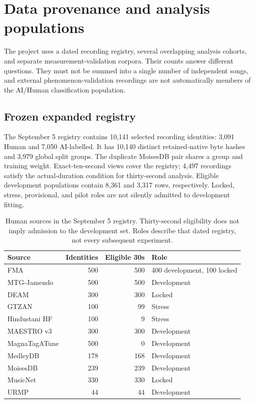 \section{Data provenance and analysis populations}
\label{sec:final-data}

The project uses a dated recording registry, several overlapping analysis
cohorts, and separate measurement-validation corpora. Their counts answer
different questions. They must not be summed into a single number of independent
songs, and external phenomenon-validation recordings are not automatically
members of the AI/Human classification population.

\subsection{Frozen expanded registry}

The September 5 registry contains 10,141 selected recording identities:
3,091 Human and 7,050 AI-labelled. It has 10,140 distinct retained-native byte
hashes and 3,979 global split groups. The duplicate MoisesDB pair shares a
group and training weight. Exact-ten-second views cover the registry; 4,497
recordings satisfy the actual-duration condition for thirty-second analysis.
Eligible development populations contain 8,361 and 3,317 rows, respectively.
Locked, stress, provisional, and pilot roles are not silently admitted to
development fitting.

\begin{table}[htbp]
\centering\small
\caption{Human sources in the September 5 registry. Thirty-second eligibility
does not imply admission to the development set. Roles describe that dated
registry, not every subsequent experiment.}
\label{tab:human-registry}
\begin{tabular}{lrrl}
\toprule
Source & Identities & Eligible 30s & Role\\
\midrule
FMA & 500 & 500 & 400 development, 100 locked\\
MTG-Jamendo & 500 & 500 & Development\\
DEAM & 300 & 300 & Locked\\
GTZAN & 100 & 99 & Stress\\
Hindustani HF & 100 & 9 & Stress\\
MAESTRO v3 & 300 & 300 & Development\\
MagnaTagATune & 500 & 0 & Development\\
MedleyDB & 178 & 168 & Development\\
MoisesDB & 239 & 239 & Development\\
MusicNet & 330 & 330 & Locked\\
URMP & 44 & 44 & Development\\
\bottomrule
\end{tabular}
\end{table}

